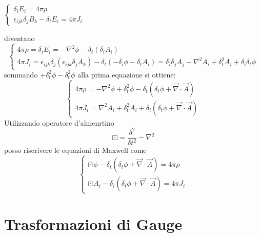 \documentclass[a4paper,11pt]{report}
\theoremstyle{remark}
\theoremstyle{definition}
\begin{document}
$\begin{cases}
    \delta_iE_i = 4\pi \rho  \\
    \epsilon_{ijk} \delta_jB_k - \delta_t E_i = 4 \pi J_i 
\end{cases}$ \newline

\noindent diventano
\begin{equation*}
    \begin{cases}
        4\pi \rho = \delta_iE_i = - \nabla^2 \phi - \delta_t (\delta_iA_i) \\
        4 \pi J_i = \epsilon_{ijk} \delta_j (\epsilon_{ijk} \delta_j A_k) - \delta_t (-\delta_i \phi - \delta_t A_i) = \delta_i\delta_j A_j - \nabla^2 A_i + \delta^2_t A_i + \delta_i\delta_t\phi
    \end{cases}
\end{equation*}
sommando $+ \delta_t^2 \phi - \delta_t^2 \phi$ alla prima equazione si ottiene:
\begin{equation*}
    \begin{cases}
        4 \pi \rho = - \nabla^2 \phi + \delta_t^2 \phi - \delta_t (\delta_t \phi + \vec{\nabla} \cdot \vec{A}) \\
        4 \pi J_i = \nabla^2 A_i + \delta_t^2 A_i +\delta_i (\delta_t \phi + \vec{\nabla} \cdot \vec{A})
    \end{cases}
\end{equation*}
Utilizzando operatore d'almenrtino 
\begin{equation*}
    \boxdot = \frac{\delta^2}{\delta t^2 } - \nabla^2
\end{equation*}
posso riscrivere le equazioni di Maxwell come
\begin{equation*}
    \begin{cases}
        \boxdot \phi - \delta_t (\delta_t \phi + \vec{\nabla} \cdot \vec{A}) = 4 \pi \rho \\
        \boxdot A_i - \delta_i (\delta_t \phi + \vec{\nabla} \cdot \vec{A}) = 4 \pi J_i
    \end{cases}
\end{equation*}

\section*{Trasformazioni di Gauge}
\end{document}
